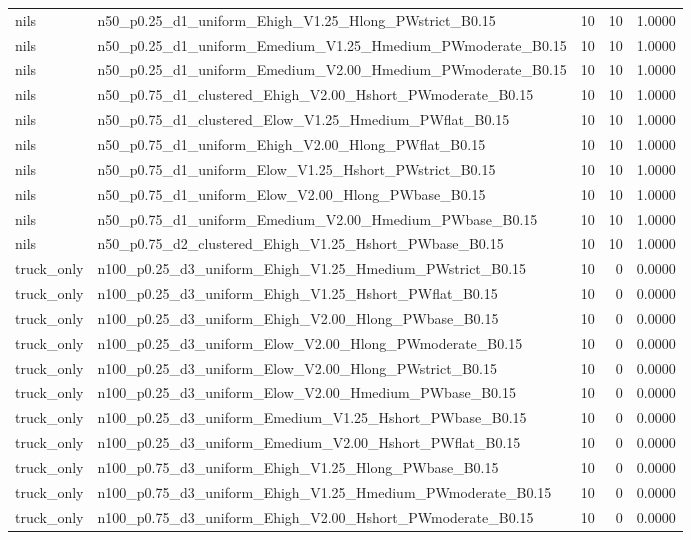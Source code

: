 \begin{tabular}{llrrr}
nils & n50_p0.25_d1_uniform_Ehigh_V1.25_Hlong_PWstrict_B0.15 & 10 & 10 & 1.0000 \\
nils & n50_p0.25_d1_uniform_Emedium_V1.25_Hmedium_PWmoderate_B0.15 & 10 & 10 & 1.0000 \\
nils & n50_p0.25_d1_uniform_Emedium_V2.00_Hmedium_PWmoderate_B0.15 & 10 & 10 & 1.0000 \\
nils & n50_p0.75_d1_clustered_Ehigh_V2.00_Hshort_PWmoderate_B0.15 & 10 & 10 & 1.0000 \\
nils & n50_p0.75_d1_clustered_Elow_V1.25_Hmedium_PWflat_B0.15 & 10 & 10 & 1.0000 \\
nils & n50_p0.75_d1_uniform_Ehigh_V2.00_Hlong_PWflat_B0.15 & 10 & 10 & 1.0000 \\
nils & n50_p0.75_d1_uniform_Elow_V1.25_Hshort_PWstrict_B0.15 & 10 & 10 & 1.0000 \\
nils & n50_p0.75_d1_uniform_Elow_V2.00_Hlong_PWbase_B0.15 & 10 & 10 & 1.0000 \\
nils & n50_p0.75_d1_uniform_Emedium_V2.00_Hmedium_PWbase_B0.15 & 10 & 10 & 1.0000 \\
nils & n50_p0.75_d2_clustered_Ehigh_V1.25_Hshort_PWbase_B0.15 & 10 & 10 & 1.0000 \\
truck_only & n100_p0.25_d3_uniform_Ehigh_V1.25_Hmedium_PWstrict_B0.15 & 10 & 0 & 0.0000 \\
truck_only & n100_p0.25_d3_uniform_Ehigh_V1.25_Hshort_PWflat_B0.15 & 10 & 0 & 0.0000 \\
truck_only & n100_p0.25_d3_uniform_Ehigh_V2.00_Hlong_PWbase_B0.15 & 10 & 0 & 0.0000 \\
truck_only & n100_p0.25_d3_uniform_Elow_V2.00_Hlong_PWmoderate_B0.15 & 10 & 0 & 0.0000 \\
truck_only & n100_p0.25_d3_uniform_Elow_V2.00_Hlong_PWstrict_B0.15 & 10 & 0 & 0.0000 \\
truck_only & n100_p0.25_d3_uniform_Elow_V2.00_Hmedium_PWbase_B0.15 & 10 & 0 & 0.0000 \\
truck_only & n100_p0.25_d3_uniform_Emedium_V1.25_Hshort_PWbase_B0.15 & 10 & 0 & 0.0000 \\
truck_only & n100_p0.25_d3_uniform_Emedium_V2.00_Hshort_PWflat_B0.15 & 10 & 0 & 0.0000 \\
truck_only & n100_p0.75_d3_uniform_Ehigh_V1.25_Hlong_PWbase_B0.15 & 10 & 0 & 0.0000 \\
truck_only & n100_p0.75_d3_uniform_Ehigh_V1.25_Hmedium_PWmoderate_B0.15 & 10 & 0 & 0.0000 \\
truck_only & n100_p0.75_d3_uniform_Ehigh_V2.00_Hshort_PWmoderate_B0.15 & 10 & 0 & 0.0000 \\

\end{tabular}
